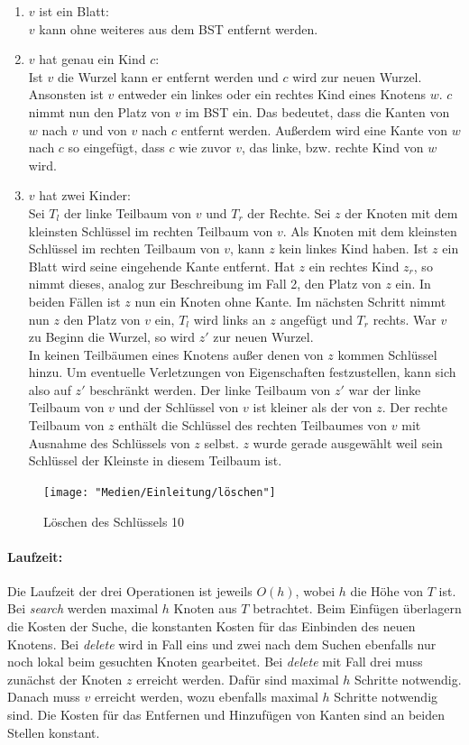 \documentclass[a4paper,12pt]{article}
\begin{document}
\begin{enumerate}
	\item $v$ ist ein Blatt: \\
	$v$ kann ohne weiteres aus dem BST entfernt werden.
	\item $v$ hat genau ein Kind $c$:\\
	Ist $v$ die Wurzel kann er entfernt werden und $c$ wird zur neuen Wurzel. Ansonsten ist $v$ entweder ein linkes oder ein rechtes Kind eines Knotens $w$. $c$ nimmt nun den Platz von $v$ im BST ein. Das bedeutet, dass die Kanten von $w$ nach $v$ und von $v$ nach $c$ entfernt werden. Außerdem wird eine Kante von $w$ nach $c$ so eingefügt, dass $c$ wie zuvor $v$, das linke, bzw. rechte Kind von $w$ wird. 
	\item $v$ hat zwei Kinder:\\
	Sei $T_l$ der linke Teilbaum von $v$ und $T_r$ der Rechte.
	Sei $z$ der Knoten mit dem kleinsten Schlüssel im rechten Teilbaum von $v$. Als Knoten mit dem kleinsten Schlüssel im rechten Teilbaum von $v$, kann $z$ kein linkes Kind haben. Ist $z$ ein Blatt wird seine eingehende Kante entfernt. Hat $z$ ein rechtes Kind $z_r$, so nimmt dieses, analog zur Beschreibung im Fall 2, den Platz von $z$ ein. In beiden Fällen ist $z$ nun ein Knoten ohne Kante. Im nächsten Schritt nimmt nun $z$ den Platz von $v$ ein, $T_l$ wird links an $z$ angefügt und $T_r$ rechts. War $v$ zu Beginn die Wurzel, so wird $z'$ zur neuen Wurzel.\\
	In keinen Teilbäumen eines Knotens außer denen von $z$ kommen Schlüssel hinzu. Um eventuelle Verletzungen von Eigenschaften festzustellen, kann sich also auf $z'$ beschränkt werden. Der linke Teilbaum von $z'$ war der linke Teilbaum von $v$ und der Schlüssel von $v$ ist kleiner als der von $z$. Der rechte Teilbaum von $z$ enthält die Schlüssel des rechten Teilbaumes von $v$ mit Ausnahme des Schlüssels von $z$ selbst. $z$ wurde gerade ausgewählt weil sein Schlüssel der Kleinste in diesem Teilbaum ist. 
	
	
	
	
\end{enumerate} 
\begin{figure}[H]
	\centering
	\texttt{[image: "Medien/Einleitung/löschen"]}
	\caption{Löschen des Schlüssels 10}
	\label{fig:löschen}
\end{figure}
\paragraph{Laufzeit:}
Die Laufzeit der drei Operationen ist jeweils $\mathit{O(h)}$, wobei $h$ die Höhe von $T$ ist. Bei \textit{search} werden maximal $h$ Knoten aus $T$ betrachtet. Beim Einfügen überlagern die Kosten der Suche, die konstanten Kosten für das Einbinden des neuen Knotens. Bei \textit{delete} wird in Fall eins und zwei nach dem Suchen ebenfalls nur noch lokal beim gesuchten Knoten gearbeitet. Bei \textit{delete} mit Fall drei muss zunächst der Knoten $z$ erreicht werden. Dafür sind maximal $h$ Schritte notwendig. Danach muss $v$ erreicht werden, wozu ebenfalls maximal $h$ Schritte notwendig sind. Die Kosten für das Entfernen und Hinzufügen von Kanten sind an beiden Stellen konstant.  
\end{document}
